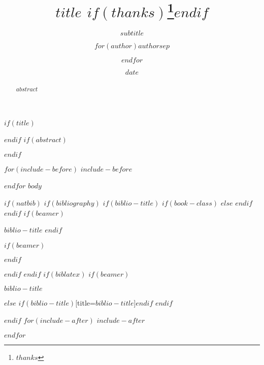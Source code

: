 \documentclass[11pt,notitlepage]{article}
\title{\vspace{-0.5in} $title$ \vspace{-0.5in}$if(thanks)$\thanks{$thanks$}$endif$}
\subtitle{$subtitle$}
\author{$for(author)$$author$$sep$ \and $endfor$}
\institute{$for(institute)$$institute$$sep$ \and $endfor$}
\date{$date$}
\begin{document}
$if(title)$
\maketitle
$endif$
$if(abstract)$
\begin{abstract}
$abstract$
\end{abstract}
$endif$

$for(include-before)$
$include-before$

$endfor$
$body$

$if(natbib)$
$if(bibliography)$
$if(biblio-title)$
$if(book-class)$
\renewcommand\bibname{$biblio-title$}
$else$
\renewcommand\refname{$biblio-title$}
$endif$
$endif$
$if(beamer)$
\begin{frame}[allowframebreaks]{$biblio-title$}
\bibliographytrue
$endif$

$if(beamer)$
\end{frame}
$endif$

$endif$
$endif$
$if(biblatex)$
$if(beamer)$
\begin{frame}[allowframebreaks]{$biblio-title$}
\bibliographytrue
\printbibliography[heading=none]
\end{frame}
$else$
\printbibliography$if(biblio-title)$[title=$biblio-title$]$endif$
$endif$

$endif$
$for(include-after)$
$include-after$

$endfor$
\end{document}
